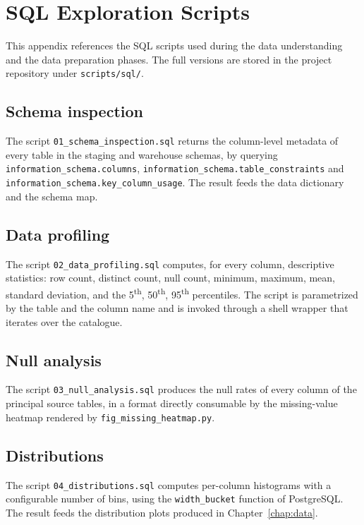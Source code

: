 \chapter{SQL Exploration Scripts}
\label{app:sql}

This appendix references the SQL scripts used during the data understanding and the data preparation phases. The full versions are stored in the project repository under \texttt{scripts/sql/}.

\section{Schema inspection}
\label{sec:app-sql-schema}
The script \texttt{01\_schema\_inspection.sql} returns the column-level metadata of every table in the staging and warehouse schemas, by querying \texttt{information\_schema.columns}, \texttt{information\_schema.table\_constraints} and \texttt{information\_schema.key\_column\_usage}. The result feeds the data dictionary and the schema map.

\section{Data profiling}
\label{sec:app-sql-profile}
The script \texttt{02\_data\_profiling.sql} computes, for every column, descriptive statistics: row count, distinct count, null count, minimum, maximum, mean, standard deviation, and the 5\textsuperscript{th}, 50\textsuperscript{th}, 95\textsuperscript{th} percentiles. The script is parametrized by the table and the column name and is invoked through a shell wrapper that iterates over the catalogue.

\section{Null analysis}
\label{sec:app-sql-null}
The script \texttt{03\_null\_analysis.sql} produces the null rates of every column of the principal source tables, in a format directly consumable by the missing-value heatmap rendered by \texttt{fig\_missing\_heatmap.py}.

\section{Distributions}
\label{sec:app-sql-distrib}
The script \texttt{04\_distributions.sql} computes per-column histograms with a configurable number of bins, using the \texttt{width\_bucket} function of PostgreSQL. The result feeds the distribution plots produced in Chapter~\ref{chap:data}.

